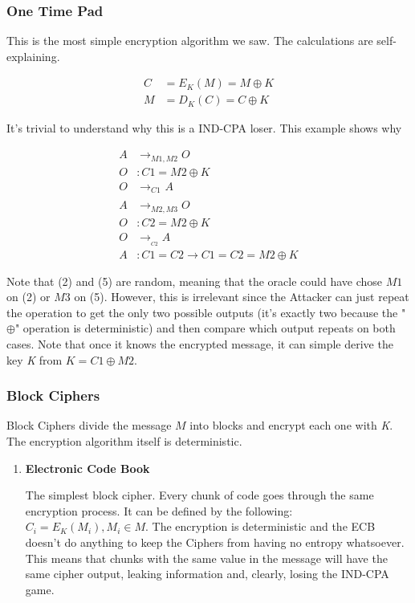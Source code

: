 \documentclass[11pt]{article}
\begin{document}
\subsubsection{One Time Pad}
\label{sec:orgf7b8525}
This is the most simple encryption algorithm we saw. The calculations are self-explaining.

\begin{align*}
C &= E_K(M) = M \oplus K \\
M &= D_K(C) = C \oplus K
\end{align*}

It's trivial to understand why this is a IND-CPA loser. This example shows why

\begin{align}
A &\to_{M1,M2} O \\
O &: C1 = M2 \oplus K \\
O &\to_{C1}_{}_{} A \\
A &\to_{M2,M3} O \\
O &: C2 = M2 \oplus K \\
O &\to_{}_{C2} A \\
A &: C1 = C2 \to C1 = C2 = M2 \oplus K
\end{align}

Note that (2) and (5) are random, meaning that the oracle could have chose \(M1\) on (2) or \(M3\) on (5). However, this is irrelevant since the Attacker can just repeat the operation to get the only two possible outputs (it's exactly two because the "\(\oplus\)" operation is deterministic) and then compare which output repeats on both cases. Note that once it knows the encrypted message, it can simple derive the key \emph{K} from \(K = C1 \oplus M2\).
\subsubsection{Block Ciphers}
\label{sec:orga319f1d}
Block Ciphers divide the message \(M\) into blocks and encrypt each one with \emph{K}. The encryption algorithm itself is deterministic.
\begin{enumerate}
\item \textbf{Electronic Code Book}
\label{sec:orgad7397e}

The simplest block cipher. Every chunk of code goes through the same encryption process. It can be defined by the following: \(C_i = E_K(M_i), M_i \in M\). The encryption is deterministic and the ECB doesn't do anything to keep the Ciphers from having no entropy whatsoever. This means that chunks with the same value in the message will have the same cipher output, leaking information and, clearly, losing the IND-CPA game.
\end{enumerate}
\end{document}
